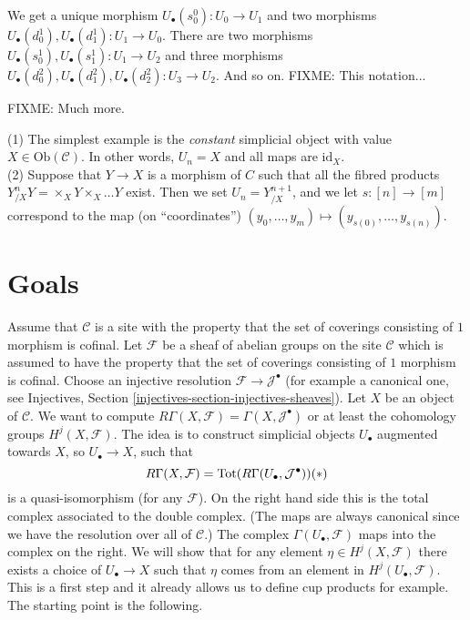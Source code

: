 \noindent
We get a unique morphism $U_\bullet(s^0_0) : U_0 \to U_1$ and
two morphisms $U_\bullet(d^1_0), U_\bullet(d^1_1) : U_1 \to U_0$.
There are two morphisms $U_\bullet(s^1_0), U_\bullet(s^1_1) :
U_1 \to U_2$ and three morphisms $U_\bullet(d^2_0), 
U_\bullet(d^2_1), U_\bullet(d^2_2) : U_3 \to U_2$. And so on.
FIXME: This notation...

\smallskip\noindent
FIXME: Much more.

\begin{example}
\label{example-simplicial-products}
(1) The simplest example is the {\it constant} simplicial object with
value $X \in \text{Ob}(\mathcal{C})$. In other words, $U_n=X$ and
all maps are $\text{id}_X$. \\
(2) Suppose that $Y\to X$ is a morphism of $C$ such that all
the fibred products $Y_{/X}^nY = \times_X Y \times_X \ldots Y$ exist.
Then we set $U_n = Y^{n+1}_{/X}$, and we let $s: [n] \to [m]$
correspond to the map (on ``coordinates'') $(y_0,\ldots, y_m) 
\mapsto (y_{s(0)},\ldots, y_{s(n)})$.
\end{example}

\section{Goals}

\noindent
Assume that $\mathcal{C}$ is a site with the property
that the set of coverings consisting of $1$ morphism is cofinal.
Let $\mathcal{F}$ be a sheaf of abelian groups on
the site $\mathcal{C}$ which is assumed to have the property
that the set of coverings consisting of $1$ morphism is cofinal.
Choose an injective resolution $\mathcal{F} \to \mathcal{J}^\bullet$
(for example a canonical one, see 
Injectives, Section \ref{injectives-section-injectives-sheaves}).
Let $X$ be an object of $\mathcal{C}$. We want to compute 
$R\Gamma(X, \mathcal{F}) = \Gamma(X, \mathcal{J}^\bullet)$
or at least the cohomology groups $H^j(X, \mathcal{F})$.
The idea is to construct simplicial objects $U_\bullet$ 
augmented towards $X$, so $U_\bullet \to X$, such that 
$$
R\Gamma(X, \mathcal{F}) 
= \text{Tot}(R\Gamma(U_\bullet, \mathcal{J}^\bullet))
\relax{(*)}
$$
is a quasi-isomorphism (for any $\mathcal{F}$). On the right hand 
side this is the total complex associated to the double complex. 
(The maps are always canonical since we have the resolution over 
all of $\mathcal{C}$.)
The complex $\Gamma(U_\bullet, \mathcal{F})$ maps into the
complex on the right. We will show that for any
element $\eta \in H^j(X, \mathcal{F})$ there exists a choice
of $U_\bullet \to X$ such that $\eta$ comes from an element
in $H^j(U_\bullet, \mathcal{F})$. This is a first step and
it already allows us to define cup products for example.
The starting point is the following.

